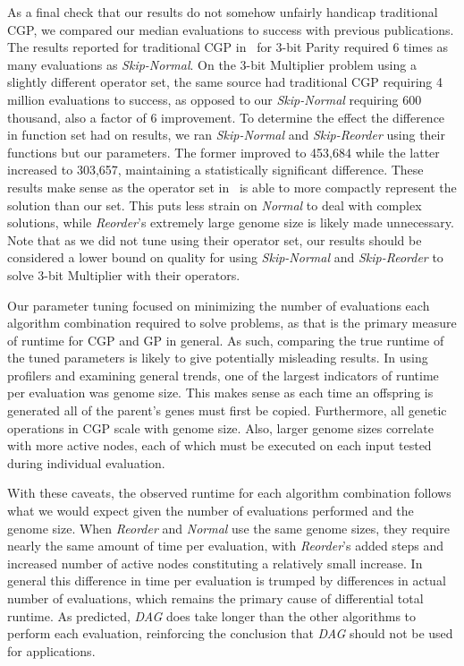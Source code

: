 \documentclass[journal]{IEEEtran}
\begin{document}
As a final check that our results do not somehow unfairly handicap traditional CGP,
we compared our median evaluations to success with previous publications.  The results
reported for traditional CGP in~\cite{walker:2008:cgpmodules}
for 3-bit Parity required 6 times as many evaluations as \emph{Skip-Normal}.
On the 3-bit Multiplier problem using a slightly different operator set,
the same source had traditional CGP requiring 4 million evaluations to success,
as opposed to our \emph{Skip-Normal} requiring 600 thousand, also a factor of 6 improvement.
To determine the effect the difference in function set had on results, we ran
\emph{Skip-Normal} and \emph{Skip-Reorder} using their functions but our parameters.
The former improved to 453,684 while the latter increased to 303,657, maintaining
a statistically significant difference.  These
results make sense as the operator set in~\cite{walker:2008:cgpmodules} is able
to more compactly represent the solution than our set.  This puts less strain
on \emph{Normal} to deal with complex solutions, while \emph{Reorder}'s extremely
large genome size is likely made unnecessary.  Note that as we did not tune
using their operator set, our results should be considered a lower bound on quality for
using \emph{Skip-Normal} and \emph{Skip-Reorder} to solve 3-bit Multiplier
with their operators.

Our parameter tuning focused on minimizing the number of evaluations each algorithm
combination required to solve problems, as that is the primary measure of runtime
for CGP and GP in general.  As such, comparing the true runtime of the tuned parameters
is likely to give potentially misleading results.  In using profilers and examining
general trends, one of the largest indicators of runtime per evaluation was genome size.
This makes sense as each time an offspring is generated all of the parent's genes
must first be copied.  Furthermore, all genetic operations in CGP scale with genome size.
Also, larger genome sizes correlate with more active nodes,
each of which must be executed on each input tested during individual evaluation.

With these caveats, the observed runtime for each algorithm combination follows
what we would expect given the number of evaluations performed and the genome size.
When \emph{Reorder} and \emph{Normal} use the same genome sizes, they require
nearly the same amount of time per evaluation, with \emph{Reorder}'s added
steps and increased number of active nodes constituting a relatively small increase.
In general this difference in time per evaluation is trumped by differences in
actual number of evaluations, which remains the primary cause of differential total runtime.
As predicted, \emph{DAG} does take longer than the other algorithms to perform each evaluation,
reinforcing the conclusion that \emph{DAG} should not be used for applications.
\end{document}
